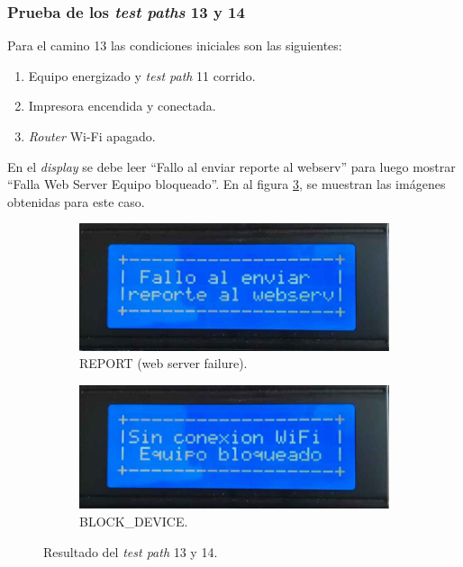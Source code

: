 \subsubsection{Prueba de los \textit{test paths} 13 y 14}
\label{subsubsec:pruRepor_13}

Para el camino 13 las condiciones iniciales son las siguientes:
\begin{enumerate}
	\item Equipo energizado y \textit{test path} 11 corrido.
	\item Impresora encendida y conectada.
	\item \textit{Router} Wi-Fi apagado.
\end{enumerate}

En el \textit{display} se debe leer ``Fallo al enviar reporte al webserv'' para luego mostrar ``Falla Web Server Equipo bloqueado''. En al figura \ref{fig:pruConf_13_res}, se muestran las imágenes obtenidas para este caso.

\begin{figure}[!htpb]
     \centering
     \begin{subfigure}[b]{0.4\textwidth}
         \centering
         \includegraphics[width=1.1\textwidth]{./Figures/falla_web_server.jpeg}
         \caption{REPORT (web server failure).}
         \label{fig:pruConf_13_1}
     \end{subfigure}
          \hfill
     \begin{subfigure}[b]{0.4\textwidth}
         \centering
         \includegraphics[width=1.1\textwidth]{./Figures/Sin_Conex_WiFi_Eq_Bloq.jpeg}
         \caption{BLOCK\_DEVICE.}
         \label{fig:pruConf_13_2}
     \end{subfigure}
        \caption{Resultado del \textit{test path} 13 y 14.}
        \label{fig:pruConf_13_res}
\end{figure}

